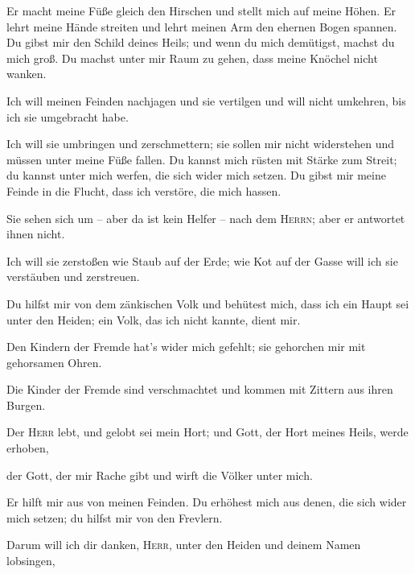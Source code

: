  Er macht meine Füße gleich den Hirschen und stellt mich
auf meine Höhen.  Er lehrt meine Hände streiten und lehrt
meinen Arm den ehernen Bogen spannen.  Du gibst mir den
Schild deines Heils; und wenn du mich demütigst, machst du mich groß.
 Du machst unter mir Raum zu gehen, dass meine Knöchel
nicht wanken.

 Ich will meinen Feinden nachjagen und sie vertilgen und
will nicht umkehren, bis ich sie umgebracht habe.

 Ich will sie umbringen und zerschmettern; sie sollen mir
nicht widerstehen und müssen unter meine Füße fallen.  Du
kannst mich rüsten mit Stärke zum Streit; du kannst unter mich werfen,
die sich wider mich setzen.  Du gibst mir meine Feinde in
die Flucht, dass ich verstöre, die mich hassen.

 Sie sehen sich um -- aber da ist kein Helfer -- nach dem
\textsc{Herrn}; aber er antwortet ihnen nicht.

 Ich will sie zerstoßen wie Staub auf der Erde; wie Kot
auf der Gasse will ich sie verstäuben und zerstreuen.

 Du hilfst mir von dem zänkischen Volk und behütest mich,
dass ich ein Haupt sei unter den Heiden; ein Volk, das ich nicht kannte,
dient mir.

 Den Kindern der Fremde hat's wider mich gefehlt; sie
gehorchen mir mit gehorsamen Ohren.

 Die Kinder der Fremde sind verschmachtet und kommen mit
Zittern aus ihren Burgen.

 Der \textsc{Herr} lebt, und gelobt sei mein Hort; und
Gott, der Hort meines Heils, werde erhoben,

 der Gott, der mir Rache gibt und wirft die Völker unter
mich.

 Er hilft mir aus von meinen Feinden. Du erhöhest mich
aus denen, die sich wider mich setzen; du hilfst mir von den Frevlern.

 Darum will ich dir danken, \textsc{Herr}, unter den
Heiden und deinem Namen lobsingen,

